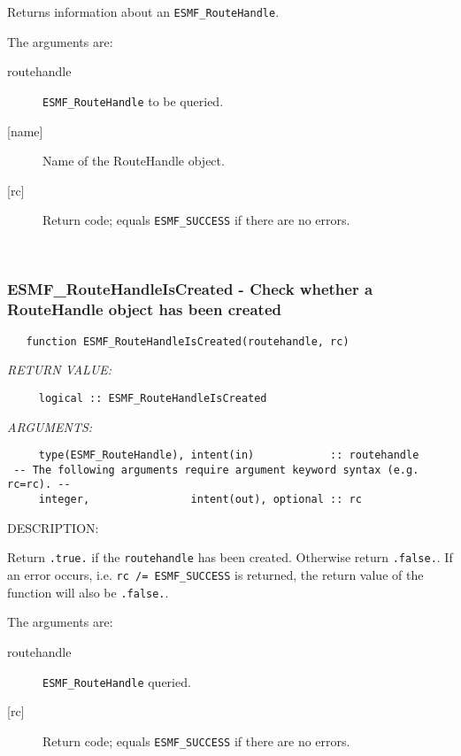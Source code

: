        Returns information about an {\tt ESMF\_RouteHandle}.
  
       The arguments are:
       \begin{description}
       \item[routehandle] 
            {\tt ESMF\_RouteHandle} to be queried.
       \item [{[name]}]
            Name of the RouteHandle object.
       \item[{[rc]}] 
            Return code; equals {\tt ESMF\_SUCCESS} if there are no errors.
       \end{description}
   
 
\mbox{}\hrulefill\ 
 
\subsubsection [ESMF\_RouteHandleIsCreated] {ESMF\_RouteHandleIsCreated - Check whether a RouteHandle object has been created}


 
\begin{verbatim}   function ESMF_RouteHandleIsCreated(routehandle, rc)\end{verbatim}{\em RETURN VALUE:}
\begin{verbatim}     logical :: ESMF_RouteHandleIsCreated\end{verbatim}{\em ARGUMENTS:}
\begin{verbatim}     type(ESMF_RouteHandle), intent(in)            :: routehandle
 -- The following arguments require argument keyword syntax (e.g. rc=rc). --
     integer,                intent(out), optional :: rc
 \end{verbatim}
{\sf DESCRIPTION:\\ }


     Return {\tt .true.} if the {\tt routehandle} has been created. Otherwise return 
     {\tt .false.}. If an error occurs, i.e. {\tt rc /= ESMF\_SUCCESS} is 
     returned, the return value of the function will also be {\tt .false.}.
  
   The arguments are:
     \begin{description}
     \item[routehandle]
       {\tt ESMF\_RouteHandle} queried.
     \item[{[rc]}]
       Return code; equals {\tt ESMF\_SUCCESS} if there are no errors.
     \end{description}
   

